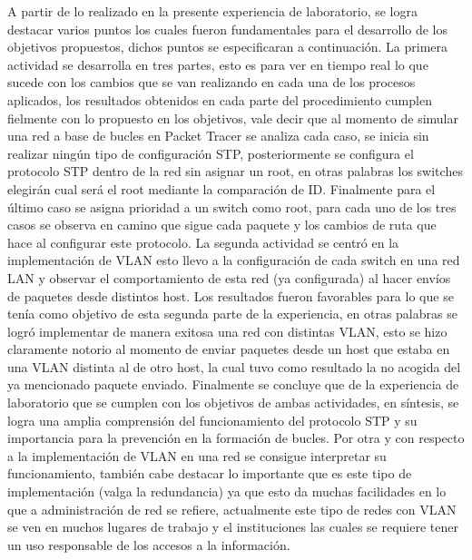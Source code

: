 \documentclass[spanish]{udpreport}
\begin{document}
A partir de lo realizado en la presente experiencia de laboratorio, se logra destacar varios puntos los cuales fueron fundamentales para el desarrollo de los objetivos propuestos, dichos puntos se especificaran a continuación.
\vspace{0.5cm}
La primera actividad se desarrolla en tres partes, esto es para ver en tiempo real lo que sucede con los cambios que se van realizando  en cada una de los procesos aplicados, los resultados obtenidos en cada parte del procedimiento cumplen fielmente con lo propuesto en los objetivos, vale decir que al momento de simular una red a base de bucles en Packet Tracer se analiza cada caso, se inicia sin realizar ningún tipo de configuración STP, posteriormente se configura el protocolo STP dentro de la red sin asignar un root, en otras palabras los switches elegirán cual será el root mediante la comparación de ID. Finalmente para el último caso se asigna prioridad a un switch como root, para cada uno de los tres casos se observa en camino que sigue cada paquete y los cambios de ruta que hace al configurar este protocolo.
\vspace{0.5cm}
La segunda actividad se centró en la implementación de VLAN esto llevo a la configuración de cada switch en una red LAN y observar el comportamiento de esta red (ya configurada) al hacer envíos de paquetes desde distintos host. Los resultados fueron favorables para lo que se tenía como objetivo de esta segunda parte de la experiencia, en otras palabras  se logró implementar de manera exitosa una red con distintas VLAN, esto se hizo claramente notorio al momento de enviar paquetes desde un host que estaba en una VLAN distinta al de otro host, la cual tuvo como resultado la no acogida del ya mencionado paquete enviado.
\vspace{0.5cm}
Finalmente se concluye que de la experiencia de laboratorio que se cumplen con los objetivos de ambas actividades, en síntesis, se logra una amplia comprensión del funcionamiento del protocolo STP y su importancia para la prevención en la formación de bucles. Por otra y con respecto a la implementación de VLAN en una red se consigue interpretar su funcionamiento, también cabe destacar lo importante que es este tipo de implementación (valga la redundancia) ya que esto da muchas facilidades en lo que a administración de red se refiere, actualmente este tipo de redes con VLAN se ven en muchos lugares de trabajo y el instituciones las cuales se requiere tener un uso responsable de los accesos a la información.
\end{document}
